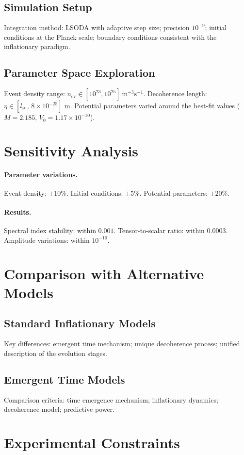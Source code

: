 \documentclass[11pt,a4paper]{article}
\begin{document}
\subsection{Simulation Setup}
Integration method: LSODA with adaptive step size; precision
$10^{-9}$; initial conditions at the Planck scale; boundary
conditions consistent with the inflationary paradigm.

\subsection{Parameter Space Exploration}
Event density range: $n_{\mathrm{ev}}\in[10^{23},10^{25}]
\ \mathrm{m^{-3}s^{-1}}$. Decoherence length:
$\eta\in[l_{\mathrm{Pl}},\,8\times10^{-25}]$ m. Potential
parameters varied around the best-fit values ($M=2.185$,
$V_{0}=1.17\times10^{-10}$).

\section{Sensitivity Analysis}
\paragraph{Parameter variations.}
Event density: $\pm10\%$. Initial conditions: $\pm5\%$. Potential
parameters: $\pm20\%$.
\paragraph{Results.}
Spectral index stability: within $0.001$. Tensor-to-scalar ratio:
within $0.0003$. Amplitude variations: within $10^{-10}$.

\section{Comparison with Alternative Models}
\subsection{Standard Inflationary Models}
Key differences: emergent time mechanism; unique decoherence
process; unified description of the evolution stages.
\subsection{Emergent Time Models}
Comparison criteria: time emergence mechanism; inflationary
dynamics; decoherence model; predictive power.

\section{Experimental Constraints}
\end{document}
